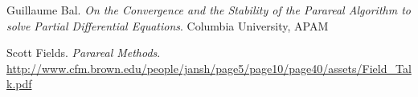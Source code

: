\begin{thebibliography}{9}
Guillaume Bal.
\textit{On the Convergence and the Stability of the Parareal Algorithm to solve
Partial Differential Equations}.
Columbia University, APAM

Scott Fields.
\textit{Parareal Methods}.
\url{http://www.cfm.brown.edu/people/jansh/page5/page10/page40/assets/Field_Talk.pdf}
\end{thebibliography}
